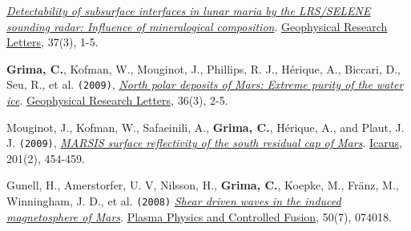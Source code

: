 \begin{etaremune}
  \href{http://onlinelibrary.wiley.com/doi/10.1029/2009GL041681/abstract}{\emph{Detectability
  of subsurface interfaces in lunar maria by the LRS/SELENE sounding
  radar: Influence of mineralogical composition}}. \ul{Geophysical Research
  Letters}, 37(3), 1-5.
\item
  \textbf{Grima, C.}, Kofman, W., Mouginot, J., Phillips, R. J.,
  Hérique, A., Biccari, D., Seu, R., et al. \texttt{(2009)},
  \href{http://onlinelibrary.wiley.com/doi/10.1029/2008GL036326/abstract}{\emph{North
  polar deposits of Mars: Extreme purity of the water ice}}. \ul{Geophysical
  Research Letters}, 36(3), 2-5.
\item
  Mouginot, J., Kofman, W., Safaeinili, A., \textbf{Grima, C.}, Hérique,
  A., and Plaut, J. J. \texttt{(2009)},
  \href{http://www.sciencedirect.com/science/article/pii/S0019103509000311}{
  \emph{MARSIS surface reflectivity of the south residual cap of Mars}}.
  \ul{Icarus}, 201(2), 454-459.
\item
  Gunell, H., Amerstorfer, U. V, Nilsson, H., \textbf{Grima, C.},
  Koepke, M., Fränz, M., Winningham, J. D., et al. \texttt{(2008)}
  \href{http://iopscience.iop.org/0741-3335/50/7/074018}{\emph{Shear
  driven waves in the induced magnetosphere of Mars}}. \ul{Plasma Physics
  and Controlled Fusion}, 50(7), 074018.
\end{etaremune}
